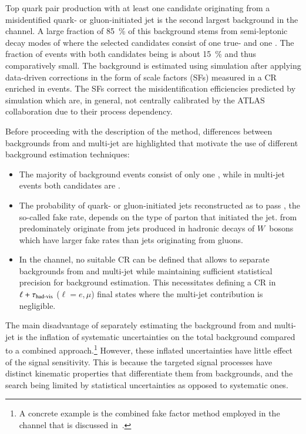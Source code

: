 Top quark pair production with at least one \tauhadvis candidate originating
from a misidentified quark- or gluon-initiated jet is the second largest
background in the \hadhad channel. A large fraction of \SI{85}{\percent} of this
background stems from semi-leptonic decay modes of \ttbar where the selected
\tauhadvis candidates consist of one true- and one \faketauhadvis. The fraction
of \ttbarFakes events with both candidates being \faketauhadvis is about
\SI{15}{\percent} and thus comparatively small. The \ttbarFakes background is
estimated using simulation after applying data-driven corrections in the form of
\faketauhadvis scale factors (SFs) measured in a CR enriched in \ttbar
events. The SFs correct the \jettotauhadvis misidentification efficiencies
predicted by simulation which are, in general, not centrally calibrated by the
ATLAS collaboration due to their process dependency.

Before proceeding with the description of the method, differences
between \faketauhadvis backgrounds from \ttbar and multi-jet are
highlighted that motivate the use of different background estimation
techniques:
\begin{itemize}

\item The majority of \ttbarFakes background events consist of only one
  \faketauhadvis, while in multi-jet events both candidates are \faketauhadvis.

\item The probability of quark- or gluon-initiated jets reconstructed
  as \tauhadvis to pass \tauid, the so-called fake rate, depends on
  the type of parton that initiated the jet. \Faketauhadvis from
  \ttbar predominately originate from jets produced in hadronic decays
  of $W$~bosons which have larger fake rates than jets originating
  from gluons.

\item In the \hadhad channel, no suitable \ttbarFakes CR can be defined that
  allows to separate \faketauhadvis backgrounds from \ttbar and multi-jet while
  maintaining sufficient statistical precision for background estimation. This
  necessitates defining a CR in $\ell + \tau_{\text{had-vis}}$ ($\ell = e, \mu$) final
  states where the multi-jet contribution is negligible.

\end{itemize}
The main disadvantage of separately estimating the \faketauhadvis
background from \ttbar and multi-jet is the inflation of systematic
uncertainties on the total \faketauhadvis background compared to a
combined approach.\footnote{A concrete example is the combined fake
  factor method employed in the \lephad channel that is discussed
  in~.} However, these inflated
uncertainties have little effect of the signal sensitivity. This is
because the targeted signal processes have distinct kinematic
properties that differentiate them from \faketauhadvis backgrounds,
and the search being limited by statistical uncertainties as opposed
to systematic ones.


